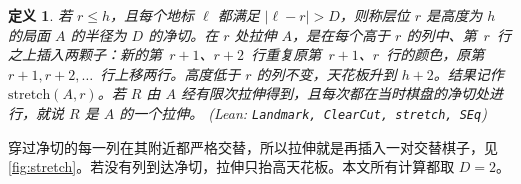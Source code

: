 \documentclass[11pt,a4paper]{article}
\theoremstyle{zhthm}
\newtheorem{definition}[theorem]{定义}
\newcommand{\code}[1]{{\upshape\texttt{\small\nolinkurl{#1}}}}
\newcommand{\leanref}[1]{(Lean: \code{#1})}
\begin{document}
\begin{definition}
\label{def:clearcut}
若 $r\le h$，且每个地标 $\ell$ 都满足 $|\ell-r|>D$，则称层位 $r$ 是高度为 $h$ 的局面 $A$ 的\emph{半径为 $D$ 的净切}。在 $r$ 处\emph{拉伸} $A$，是在每个高于 $r$ 的列中、第~$r$~行之上插入两颗子：新的第~$r+1$、$r+2$~行重复原第~$r+1$、$r$~行的颜色，原第~$r+1,r+2,\dots$~行上移两行。高度低于 $r$ 的列不变，天花板升到 $h+2$。结果记作 $\mathrm{stretch}(A,r)$。若 $R$ 由 $A$ 经有限次拉伸得到，且每次都在当时棋盘的净切处进行，就说 $R$ 是 $A$ 的一个\emph{拉伸}。
\leanref{Landmark, ClearCut, stretch, SEq}
\end{definition}

穿过净切的每一列在其附近都严格交替，所以拉伸就是再插入一对交替棋子，见 \cref{fig:stretch}。若没有列到达净切，拉伸只抬高天花板。本文所有计算都取 $D=2$。
\end{document}
